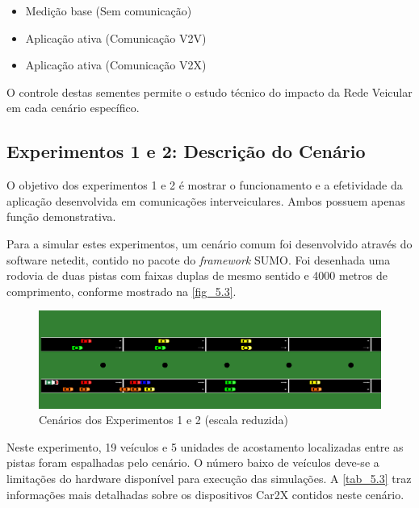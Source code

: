 \documentclass[
12pt,				%
openright,			%
oneside,			%
a4paper,			%
brazil,				%
]{abntex2}
\begin{document}
	\begin{itemize}
		\item Medição base (Sem comunicação)
		\item Aplicação ativa (Comunicação V2V)
		\item Aplicação ativa (Comunicação V2X)
	\end{itemize}
	
	\par O controle destas sementes permite o estudo técnico do impacto da Rede Veicular em cada cenário específico.

	\subsection{Experimentos 1 e 2: Descrição do Cenário}
	
	\par O objetivo dos experimentos 1 e 2 é mostrar o funcionamento e a efetividade da aplicação desenvolvida em comunicações interveiculares. Ambos possuem apenas função demonstrativa.
	
	\par Para a simular estes experimentos, um cenário comum foi desenvolvido através do  software netedit, contido no pacote do \textit{framework} SUMO. Foi desenhada uma rodovia de duas pistas com faixas duplas de mesmo sentido e 4000 metros de comprimento, conforme mostrado na \autoref{fig_5.3}.
	
	 \begin{figure}[H]
	 	\centering
	 	\includegraphics[scale=.355]{figuras/cap5/53CenarioExperimentos1e2}
	 	\caption{\label{fig_5.3}Cenários dos Experimentos 1 e 2 (escala reduzida)}
	 \end{figure}
	 
	 \par Neste experimento, 19 veículos e 5 unidades de acostamento localizadas entre as pistas foram espalhadas pelo cenário. O número baixo de veículos deve-se a limitações do hardware disponível para execução das simulações. A \autoref{tab_5.3} traz informações mais detalhadas sobre os dispositivos Car2X contidos neste cenário.
	 
\end{document}

